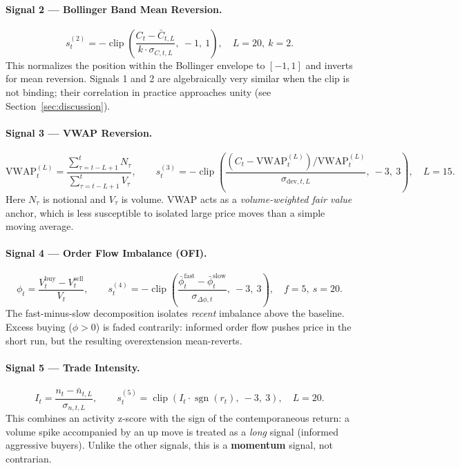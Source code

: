 \documentclass[11pt, a4paper]{article}
\begin{document}
\paragraph{Signal 2 --- Bollinger Band Mean Reversion.}
\[
s^{(2)}_t = -\operatorname{clip}\!\left(
  \frac{C_t - \bar{C}_{t,L}}{k \cdot \sigma_{C,t,L}},\ -1,\ 1
\right),
\quad L=20,\ k=2.
\]
This normalizes the position within the Bollinger envelope to $[-1, 1]$ and
inverts for mean reversion.  Signals 1 and 2 are algebraically very similar
when the clip is not binding; their correlation in practice approaches unity
(see Section~\ref{sec:discussion}).

\paragraph{Signal 3 --- VWAP Reversion.}
\[
\mathrm{VWAP}^{(L)}_t
  = \frac{\sum_{\tau=t-L+1}^{t} N_\tau}{\sum_{\tau=t-L+1}^{t} V_\tau},
\qquad
s^{(3)}_t
  = -\operatorname{clip}\!\left(
     \frac{(C_t - \mathrm{VWAP}^{(L)}_t) / \mathrm{VWAP}^{(L)}_t}
          {\sigma_{\mathrm{dev},t,L}},\ -3,\ 3
   \right), \quad L=15.
\]
Here $N_\tau$ is notional and $V_\tau$ is volume.  VWAP acts as a
\textit{volume-weighted fair value} anchor, which is less susceptible to
isolated large price moves than a simple moving average.

\paragraph{Signal 4 --- Order Flow Imbalance (OFI).}
\[
\phi_t = \frac{V^{\mathrm{buy}}_t - V^{\mathrm{sell}}_t}{V_t},
\qquad
s^{(4)}_t
  = -\operatorname{clip}\!\left(
     \frac{\bar{\phi}^{\mathrm{fast}}_t - \bar{\phi}^{\mathrm{slow}}_t}
          {\sigma_{\Delta\phi,t}},\ -3,\ 3
   \right), \quad f=5,\ s=20.
\]
The fast-minus-slow decomposition isolates \textit{recent} imbalance above
the baseline.  Excess buying ($\phi > 0$) is faded contrarily: informed
order flow pushes price in the short run, but the resulting
overextension mean-reverts.

\paragraph{Signal 5 --- Trade Intensity.}
\[
I_t = \frac{n_t - \bar{n}_{t,L}}{\sigma_{n,t,L}},
\qquad
s^{(5)}_t
  = \operatorname{clip}\!\left(I_t \cdot \operatorname{sgn}(r_t),\ -3,\ 3
  \right), \quad L=20.
\]
This combines an activity z-score with the sign of the contemporaneous return:
a volume spike accompanied by an up move is treated as a \textit{long} signal
(informed aggressive buyers).  Unlike the other signals, this is a
\textbf{momentum} signal, not contrarian.
\end{document}

